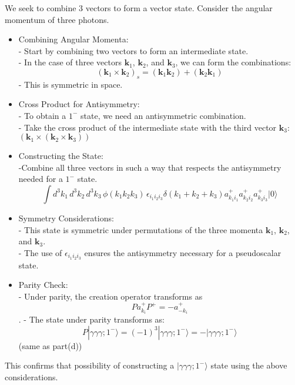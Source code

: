 \begin{enumerate}
            \begin{solution}
                  We seek to combine 3 vectors to form a vector state. Consider the angular momentum of three photons.
                  \begin{itemize}
                        \item Combining Angular Momenta:\\
                              - Start by combining two vectors to form an intermediate state.\\
                              - In the case of three vectors $ \mathbf{k}_1 $, $ \mathbf{k}_2$, and $ \mathbf{k}_3$, we can form the combinations:
                              $$     (\mathbf{k}_1 \times \mathbf{k}_2)_s = (\mathbf{k}_1 \mathbf{k}_2) + (\mathbf{k}_2 \mathbf{k}_1)
                              $$
                              - This is symmetric in space.
                        \item Cross Product for Antisymmetry:\\
                              - To obtain a $ 1^- $ state, we need an antisymmetric combination.\\
                              - Take the cross product of the intermediate state with the third vector $\mathbf{k}_3 $:$(\mathbf{k}_1 \times (\mathbf{k}_2 \times \mathbf{k}_3))$
                        \item Constructing the State:\\
                              -Combine all three vectors in such a way that respects the antisymmetry needed for a $ 1^-$ state.
                              $$\int d^3 k_1 \, d^3 k_2 \, d^3 k_3 \, \phi(k_1 k_2 k_3) \, \epsilon_{i_1 i_2 i_3} \delta(k_1 + k_2 + k_3) a^+_{k_{1} i_1} a^+_{k_{2} i_2} a^+_{k_{3} i_3} | 0 \rangle$$
                        \item Symmetry Considerations:\\
                              - This state is symmetric under permutations of the three momenta \( \mathbf{k}_1 \), \( \mathbf{k}_2 \), and \( \mathbf{k}_3 \).\\
                              - The use of \(\epsilon_{i_1 i_2 i_3}\) ensures the antisymmetry necessary for a pseudoscalar state.
                        \item  Parity Check:\\
                              - Under parity, the creation operator transforms as $$ P a^+_{k_i} P^+ = -a^+_{-k_i} $$.
                              - The state under parity transforms as:
                              $$P | \gamma\gamma\gamma; 1^- \rangle = (-1)^3 | \gamma\gamma\gamma; 1^- \rangle = -| \gamma\gamma\gamma; 1^- \rangle$$ (same as part(d))
                  \end{itemize}
                  This confirms that  possibility of constructing a $| \gamma\gamma\gamma; 1^- \rangle$ state using the above considerations.
            \end{solution}

\end{enumerate}
